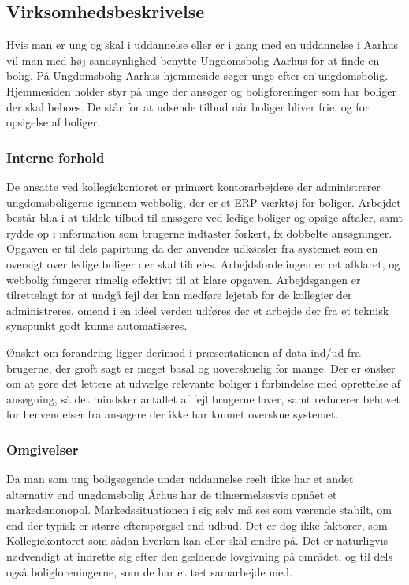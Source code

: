 \documentclass[12pt, a4paper]{report}
\begin{document}
\subsection{Virksomhedsbeskrivelse}
Hvis man er ung og skal i uddannelse eller er i gang med en uddannelse i Aarhus vil man med høj sandsynlighed benytte Ungdomsbolig Aarhus for at finde en bolig. På Ungdomsbolig Aarhus hjemmeside søger unge efter en ungdomsbolig. Hjemmesiden holder styr på unge der ansøger og boligforeninger som har boliger der skal beboes. De står for at udsende tilbud når boliger bliver frie, og for opsigelse af boliger.

  \subsubsection{Interne forhold}
De ansatte ved kollegiekontoret er primært kontorarbejdere der administrerer ungdomsboligerne igennem webbolig, der er et ERP værktøj for boliger. Arbejdet består bl.a i at tildele tilbud til ansøgere ved ledige boliger og opsige aftaler, samt rydde op i information som brugerne indtaster forkert, fx dobbelte ansøgninger. Opgaven er til dels papirtung da der anvendes udkørsler fra systemet som en oversigt over ledige boliger der skal tildeles. Arbejdsfordelingen er ret afklaret, og webbolig fungerer rimelig effektivt til at klare opgaven. Arbejdsgangen er tilrettelagt for at undgå fejl der kan medføre lejetab for de kollegier der administreres, omend i en idéel verden udføres der et arbejde der fra et teknisk synspunkt godt kunne automatiseres.

Ønsket om forandring ligger derimod i præsentationen af data ind/ud fra brugerne, der groft sagt er meget basal og uoverskuelig for mange. Der er ønsker om at gøre det lettere at udvælge relevante boliger i forbindelse med oprettelse af ansøgning, så det mindsker antallet af fejl brugerne laver, samt reducerer behovet for henvendelser fra ansøgere der ikke har kunnet overskue systemet.

  \subsubsection{Omgivelser}
Da man som ung boligsøgende under uddannelse reelt ikke har et andet alternativ end ungdomsbolig Århus har de tilnærmelsesvis opnået et markedsmonopol. Markedssituationen i sig selv må ses som værende stabilt, om end der typisk er større efterspørgsel end udbud. Det er dog ikke faktorer, som Kollegiekontoret som sådan hverken kan eller skal ændre på. Det er naturligvis nødvendigt at indrette sig efter den gældende lovgivning på området, og til dels også boligforeningerne, som de har et tæt samarbejde med.
\end{document}
